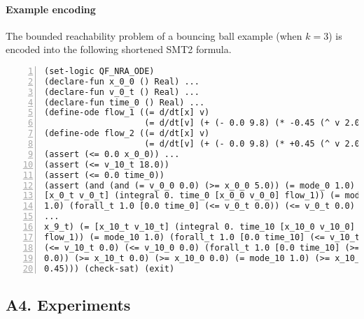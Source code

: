 \paragraph{Example encoding} The bounded reachability problem of a
bouncing ball example (when $k = 3$) is encoded into the following
shortened SMT2 formula.
\begin{Verbatim}[fontfamily=courier, frame=single, framesep=1mm,  numbers=left, fontsize=\scriptsize]
(set-logic QF_NRA_ODE)
(declare-fun x_0_0 () Real) ...
(declare-fun v_0_t () Real) ...
(declare-fun time_0 () Real) ...
(define-ode flow_1 ((= d/dt[x] v)
                    (= d/dt[v] (+ (- 0.0 9.8) (* -0.45 (^ v 2.0))))))
(define-ode flow_2 ((= d/dt[x] v)
                    (= d/dt[v] (+ (- 0.0 9.8) (* +0.45 (^ v 2.0))))))
(assert (<= 0.0 x_0_0)) ...
(assert (<= v_10_t 18.0))
(assert (<= 0.0 time_0))
(assert (and (and (= v_0_0 0.0) (>= x_0_0 5.0)) (= mode_0 1.0) (=
[x_0_t v_0_t] (integral 0. time_0 [x_0_0 v_0_0] flow_1)) (= mode_0
1.0) (forall_t 1.0 [0.0 time_0] (<= v_0_t 0.0)) (<= v_0_t 0.0) (<=
...
x_9_t) (= [x_10_t v_10_t] (integral 0. time_10 [x_10_0 v_10_0]
flow_1)) (= mode_10 1.0) (forall_t 1.0 [0.0 time_10] (<= v_10_t 0.0))
(<= v_10_t 0.0) (<= v_10_0 0.0) (forall_t 1.0 [0.0 time_10] (>= x_10_t
0.0)) (>= x_10_t 0.0) (>= x_10_0 0.0) (= mode_10 1.0) (>= x_10_t
0.45))) (check-sat) (exit)
\end{Verbatim}



\subsection*{A4. Experiments}\label{sec:exp}


